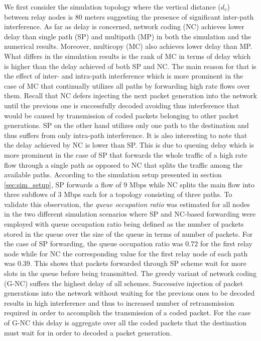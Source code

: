 \documentclass[journal, onecolumn, 12pt]{IEEEtran}
\begin{document}
We first consider the simulation topology where the vertical distance ($d_{v}$) between relay nodes is $80$ meters suggesting the presence of significant inter-path interference.
As far as delay is concerned, network coding (NC) achieves lower delay than single path (SP) and multipath (MP) in both the simulation and the numerical results.
Moreover, multicopy (MC) also achieves lower delay than MP.
What differs in the simulation results is the rank of MC in terms of delay which is higher than the delay achieved of both SP and NC.
The main reason for that is the effect of inter- and intra-path interference which is more prominent in the case of MC that continually utilizes all paths by forwarding high rate flows over them.
Recall that NC defers injecting the next packet generation into the network until the previous one is successfully decoded avoiding thus interference that would be caused by
transmission of coded packets belonging to other packet generations.
SP on the other hand utilizes only one path to the destination and thus suffers from only intra-path interference.
It is also interesting to note that the delay achieved by NC is lower than SP.
This is due to queuing delay which is more prominent in the case of SP that forwards the whole traffic of a high rate flow through a single path as opposed to NC that splits the traffic among the available paths.
According to the simulation setup presented in section \ref{sec:sim_setup}, SP forwards a flow of $9$ Mbps while NC splits the main flow into three subflows of $3$ Mbps each for a topology consisting of three paths.
To validate this observation, the \textit{queue occupation ratio} was estimated for all nodes in the two different simulation scenarios where SP and NC-based forwarding were employed
with queue occupation ratio being defined as the number of packets stored in the queue over the size of the queue in terms of number of packets.
For the case of SP forwarding, the queue occupation ratio was 0.72 for the first relay node while for NC the corresponding value for the first relay node of each path was 0.39.
This shows that packets forwarded through SP scheme wait for more slots in the queue before being transmitted.
The greedy variant of network coding (G-NC) suffers the highest delay of all schemes.
Successive injection of packet generations into the network without waiting for the previous ones to be decoded results in high interference and thus to increased number of retransmission required in order
to accomplish the transmission of a coded packet.
For the case of G-NC this delay is aggregate over all the coded packets that the destination must wait for in order to decoded a packet generation.
\end{document}
